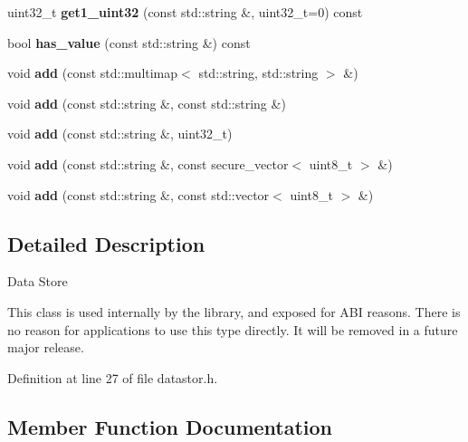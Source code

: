 \begin{DoxyCompactItemize}
uint32\+\_\+t {\bfseries get1\+\_\+uint32} (const std\+::string \&, uint32\+\_\+t=0) const
\item 
\mbox{\label{class_botan_1_1_data___store_aafc5f8638f5246ec0c5f40512eb282a0}} 
bool {\bfseries has\+\_\+value} (const std\+::string \&) const
\item 
\mbox{\label{class_botan_1_1_data___store_a83319d25d3d220c6c45f8263f5f7d762}} 
void {\bfseries add} (const std\+::multimap$<$ std\+::string, std\+::string $>$ \&)
\item 
\mbox{\label{class_botan_1_1_data___store_a2b305c27d3ea0eafaf4e4e6cba49fabc}} 
void {\bfseries add} (const std\+::string \&, const std\+::string \&)
\item 
\mbox{\label{class_botan_1_1_data___store_af5e1b8f92bee8933bd7741875f5ce1e6}} 
void {\bfseries add} (const std\+::string \&, uint32\+\_\+t)
\item 
\mbox{\label{class_botan_1_1_data___store_a33d8c85ea41afed8b5e6697ad8072b01}} 
void {\bfseries add} (const std\+::string \&, const secure\+\_\+vector$<$ uint8\+\_\+t $>$ \&)
\item 
\mbox{\label{class_botan_1_1_data___store_a35d93f5b346a4c9a0e98e41ac6e574fb}} 
void {\bfseries add} (const std\+::string \&, const std\+::vector$<$ uint8\+\_\+t $>$ \&)
\end{DoxyCompactItemize}


\subsection{Detailed Description}
Data Store

This class is used internally by the library, and exposed for A\+BI reasons. There is no reason for applications to use this type directly. It will be removed in a future major release. 

Definition at line 27 of file datastor.\+h.



\subsection{Member Function Documentation}
\mbox{\label{class_botan_1_1_data___store_a8c889aa5cbadc64821c72e77f3a6a19c}} 
